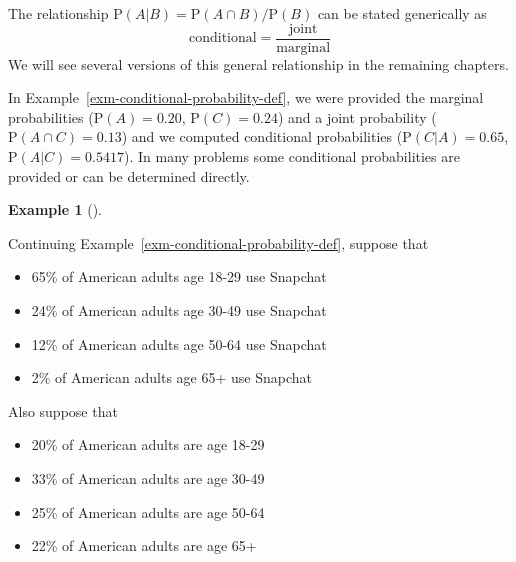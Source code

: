 \documentclass[
  letterpaper,
  DIV=11,
  numbers=noendperiod]{scrreprt}
\providecommand{\tightlist}{%
  \setlength{\itemsep}{0pt}\setlength{\parskip}{0pt}}
\theoremstyle{plain}
\theoremstyle{definition}
\newtheorem{example}{Example}[chapter]
\theoremstyle{definition}
\theoremstyle{definition}
\theoremstyle{remark}
\begin{document}
The relationship \(\textrm{P}(A|B) = \textrm{P}(A\cap B)/\textrm{P}(B)\)
can be stated generically as \[
\text{conditional} = \frac{\text{joint}}{\text{marginal}}
\] We will see several versions of this general relationship in the
remaining chapters.

In Example~\ref{exm-conditional-probability-def}, we were provided the
marginal probabilities (\(\textrm{P}(A) = 0.20\),
\(\textrm{P}(C) = 0.24\)) and a joint probability
(\(\textrm{P}(A \cap C) = 0.13\)) and we computed conditional
probabilities (\(\textrm{P}(C|A) = 0.65\),
\(\textrm{P}(A|C) = 0.5417\)). In many problems some conditional
probabilities are provided or can be determined directly.

\begin{tcolorbox}[enhanced jigsaw, opacityback=0, left=2mm, colframe=quarto-callout-note-color-frame, toprule=.15mm, breakable, colback=white, leftrule=.75mm, arc=.35mm, rightrule=.15mm, bottomrule=.15mm]

\begin{example}[]\protect\hypertarget{exm-conditional-probability-def2}{}\label{exm-conditional-probability-def2}

Continuing Example~\ref{exm-conditional-probability-def}, suppose that

\begin{itemize}
\tightlist
\item
  65\% of American adults age 18-29 use Snapchat
\item
  24\% of American adults age 30-49 use Snapchat
\item
  12\% of American adults age 50-64 use Snapchat
\item
  2\% of American adults age 65+ use Snapchat
\end{itemize}

Also suppose that

\begin{itemize}
\tightlist
\item
  20\% of American adults are age 18-29
\item
  33\% of American adults are age 30-49
\item
  25\% of American adults are age 50-64
\item
  22\% of American adults are age 65+
\end{itemize}


\end{example}
\end{tcolorbox}
\end{document}
